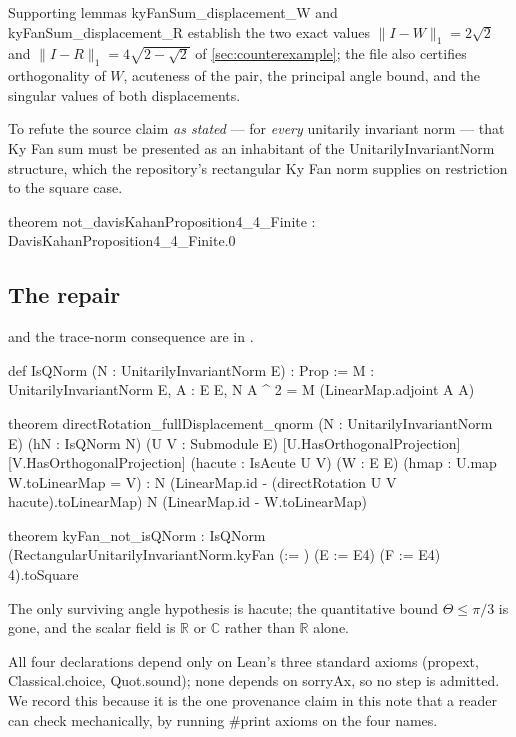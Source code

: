 \documentclass[11pt]{article}
\theoremstyle{definition}
\newcommand{\R}{\mathbb R}
\newcommand{\trnorm}[1]{\lVert #1\rVert_1}
\newcommand{\code}[1]{{\ttfamily\color{kwcode}#1}}
\begin{document}
Supporting lemmas \code{kyFanSum\_displacement\_W} and
\code{kyFanSum\_displacement\_R} establish the two exact values
$\trnorm{I-W}=2\sqrt2$ and $\trnorm{I-R}=4\sqrt{2-\sqrt2}$ of
\cref{sec:counterexample}; the file also certifies orthogonality of $W$,
acuteness of the pair, the principal angle bound, and the singular values of
both displacements.

To refute the source claim \emph{as stated} --- for \emph{every} unitarily
invariant norm --- that Ky Fan sum must be presented as an inhabitant of the
\code{UnitarilyInvariantNorm} structure, which the repository's rectangular Ky
Fan norm supplies on restriction to the square case.

\begin{LeanCode}
theorem not_davisKahanProposition4_4_Finite :
    \not DavisKahanProposition4_4_Finite.{0}
\end{LeanCode}

\subsection{The repair}
\label{sec:leanrepair}

 and the trace-norm consequence are in .

\begin{LeanCode}
def IsQNorm (N : UnitarilyInvariantNorm \Field E) : Prop :=
  \exists M : UnitarilyInvariantNorm \Field E,
    \forall A : E \toLin[\Field] E,
      N A ^ 2 = M (LinearMap.adjoint A \comp A)

theorem directRotation_fullDisplacement_qnorm
    (N : UnitarilyInvariantNorm \Field E) (hN : IsQNorm N)
    (U V : Submodule \Field E)
    [U.HasOrthogonalProjection] [V.HasOrthogonalProjection]
    (hacute : IsAcute U V) (W : E \liso[\Field] E)
    (hmap : U.map W.toLinearMap = V) :
    N (LinearMap.id - (directRotation U V hacute).toLinearMap) \le
      N (LinearMap.id - W.toLinearMap)

theorem kyFan_not_isQNorm :
    \not IsQNorm (RectangularUnitarilyInvariantNorm.kyFan
      (\Field := \Real) (E := E4) (F := E4) 4).toSquare
\end{LeanCode}

The only surviving angle hypothesis is \code{hacute}; the quantitative bound
$\Theta\leq\pi/3$ is gone, and the scalar field is $\R$ or $\mathbb C$ rather
than $\R$ alone.

All four declarations depend only on Lean's three standard axioms
(\code{propext}, \code{Classical.choice}, \code{Quot.sound}); none depends on
\code{sorryAx}, so no step is admitted.  We record this because it is the one
provenance claim in this note that a reader can check mechanically, by running
\code{\#print axioms} on the four names.
\end{document}
